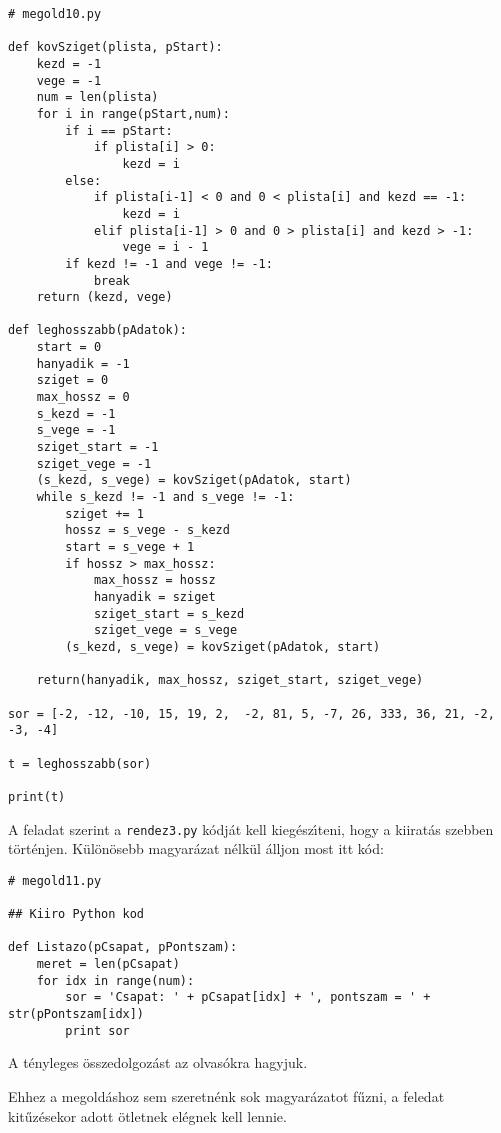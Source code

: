 \begin{Verbatim}[fontsize=\small]
# megold10.py

def kovSziget(plista, pStart):
    kezd = -1
    vege = -1
    num = len(plista)
    for i in range(pStart,num):
        if i == pStart:
            if plista[i] > 0:
                kezd = i
        else:
            if plista[i-1] < 0 and 0 < plista[i] and kezd == -1:
                kezd = i
            elif plista[i-1] > 0 and 0 > plista[i] and kezd > -1:
                vege = i - 1
        if kezd != -1 and vege != -1:
            break
    return (kezd, vege)

def leghosszabb(pAdatok):
    start = 0
    hanyadik = -1
    sziget = 0
    max_hossz = 0
    s_kezd = -1
    s_vege = -1
    sziget_start = -1
    sziget_vege = -1
    (s_kezd, s_vege) = kovSziget(pAdatok, start)
    while s_kezd != -1 and s_vege != -1:
        sziget += 1
        hossz = s_vege - s_kezd
        start = s_vege + 1
        if hossz > max_hossz:
            max_hossz = hossz
            hanyadik = sziget
            sziget_start = s_kezd
            sziget_vege = s_vege
        (s_kezd, s_vege) = kovSziget(pAdatok, start)

    return(hanyadik, max_hossz, sziget_start, sziget_vege)

sor = [-2, -12, -10, 15, 19, 2,  -2, 81, 5, -7, 26, 333, 36, 21, -2, -3, -4] 

t = leghosszabb(sor)

print(t)

\end{Verbatim}

\themegold

A feladat szerint a {\tt rendez3.py} k\'odj\'at kell kieg\'esz\'{\i}teni, hogy a kiirat\'as 
szebben t\"ort\'enjen. K\"ul\"on\"osebb magyar\'azat n\'elk\"ul \'alljon most itt k\'od:

\begin{Verbatim}[fontsize=\small]
# megold11.py

## Kiiro Python kod

def Listazo(pCsapat, pPontszam):
    meret = len(pCsapat)
    for idx in range(num):
        sor = 'Csapat: ' + pCsapat[idx] + ', pontszam = ' + str(pPontszam[idx])
        print sor

\end{Verbatim}

\noindent A t\'enyleges \"osszedolgoz\'ast az olvas\'okra hagyjuk.

\themegold

Ehhez a megold\'ashoz sem szeretn\'enk sok magyar\'azatot f\H{u}zni, a feledat kit\H{u}z\'esekor 
adott \"otletnek el\'egnek kell lennie.

